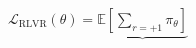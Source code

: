 \documentclass[preview]{standalone}
\begin{document}
\begin{align*}
\mathcal{L}_{\mathrm{RLVR}}(\theta) = \underbrace{\mathbb{E}\!\left[\sum_{r=+1}\pi_\theta\right]}_{\text{}}
\end{align*}
\end{document}
